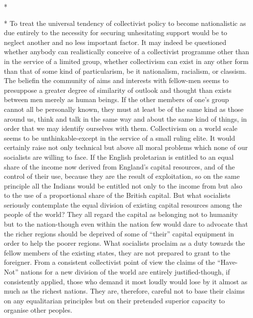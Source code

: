 \documentclass[11pt,openany]{book}
\begin{document}
\begin{center}\textasteriskcentered\hspace{0.9em}\textasteriskcentered\hspace{0.9em}\textasteriskcentered\end{center}

\begin{center}\textasteriskcentered\hspace{0.9em}\textasteriskcentered\hspace{0.9em}\textasteriskcentered\end{center}

*

* To treat the universal tendency of collectivist policy to become nationalistic as due entirely to the necessity for securing unhesitating support would be to neglect another and no less important factor. It may indeed be questioned whether anybody can realistically conceive of a collectivist programme other than in the service of a limited group, whether collectivism can exist in any other form than that of some kind of particularism, be it nationalism, racialism, or classism. The beliefin the community of aims and interests with fellow-men seems to presuppose a greater degree of similarity of outlook and thought than exists between men merely as human beings. If the other members of one's group cannot all be personally known, they must at least be of the same kind as those around us, think and talk in the same way and about the same kind of things, in order that we may identify ourselves with them. Collectivism on a world scale seems to be unthinkable-except in the service of a small ruling elite. It would certainly raise not only technical but above all moral problems which none of our socialists are willing to face. If the English proletarian is entitled to an equal share of the income now derived from England's capital resources, and of the control of their use, because they are the result of exploitation, so on the same principle all the Indians would be entitled not only to the income from but also to the use of a proportional share of the British capital. But what socialists seriously contemplate the equal division of existing capital resources among the people of the world? They all regard the capital as belonging not to humanity but to the nation-though even within the nation few would dare to advocate that the richer regions should be deprived of some of ``their'' capital equipment in order to help the poorer regions. What socialists proclaim as a duty towards the fellow members of the existing states, they are not prepared to grant to the foreigner. From a consistent collectivist point of view the claims of the ``Have-Not'' nations for a new division of the world are entirely justified-though, if consistently applied, those who demand it most loudly would lose by it almost as much as the richest nations. They are, therefore, careful not to base their claims on any equalitarian principles but on their pretended superior capacity to organise other peoples.
\end{document}
